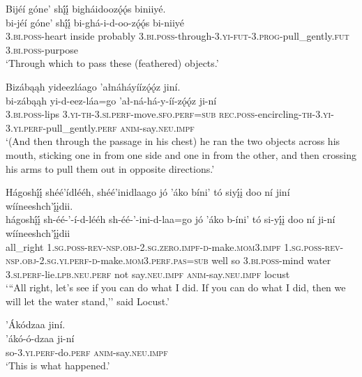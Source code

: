 \ea\label{ex:text4-4-23}
Bijéí góne’ shį́į́ bigháidoozǫ́ǫ́s biniiyé.\\
\gll bi-jéí	góne’	shį́į́	bi-ghá-i-d-oo-zǫ́ǫ́s	bi-niiyé\\
     3.\textsc{bi}.\textsc{poss}-heart	inside	probably	3.\textsc{bi}.\textsc{poss}-through-3.\textsc{yi}-\textsc{fut}-3.\textsc{prog}-pull\_gently.\textsc{fut}	3.\textsc{bi}.\textsc{poss}-purpose\\
\glt `Through which to pass these (feathered) objects.'
\z

\ea\label{ex:text4-4-24}
Bizábąąh yideezláago ’ałnáháyíízǫ́ǫ́z jiní.\\
\gll bi-zábąąh	yi-d-eez-láa=go	’ał-ná-há-y-íí-zǫ́ǫ́z	ji-ní\\
     3.\textsc{bi}.\textsc{poss}-lips	3.\textsc{yi}-\textsc{th}-3.\textsc{si}.\textsc{perf}-move.\textsc{sfo}.\textsc{perf}=\textsc{sub}	\textsc{rec}.\textsc{poss}-encircling-\textsc{th}-3.\textsc{yi}-3.\textsc{yi}.\textsc{perf}-pull\_gently.\textsc{perf}	\textsc{anim}-say.\textsc{neu}.\textsc{impf}\\
\glt `(And then through the passage in his chest) he ran the two objects across his mouth, sticking one in from one side and one in from the other, and then crossing his arms to pull them out in opposite directions.'
\z

\ea\label{ex:text4-4-25}
Hágoshį́į́ shéé’ídlééh, shéé’inidlaago jó ’áko bíni’ tó siyį́į doo ní jiní wííneeshch’į́įdii.\\
\gll hágoshį́į́	sh-éé-’-í-d-lééh	sh-éé-’-ini-d-laa=go	jó	’áko	b-íni’	tó	si-yį́į	doo	ní	ji-ní	wííneeshch’į́įdii\\
     all\_right	1.\textsc{sg}.\textsc{poss}-\textsc{rev}-\textsc{nsp}.\textsc{obj}-2.\textsc{sg}.\textsc{zero}.\textsc{impf}-\textsc{d}-make.\textsc{mom}3.\textsc{impf}	1.\textsc{sg}.\textsc{poss}-\textsc{rev}-\textsc{nsp}.\textsc{obj}-2.\textsc{sg}.\textsc{yi}.\textsc{perf}-\textsc{d}-make.\textsc{mom}3.\textsc{perf}.\textsc{pas}=\textsc{sub}	well	so	3.\textsc{bi}.\textsc{poss}-mind	water	3.\textsc{si}.\textsc{perf}-lie.\textsc{lpb}.\textsc{neu}.\textsc{perf}	not	say.\textsc{neu}.\textsc{impf}	\textsc{anim}-say.\textsc{neu}.\textsc{impf}	locust\\
\glt `{``}All right, let's see if you can do what I did. If you can do what I did, then we will let the water stand,'' said Locust.'
\z

\ea\label{ex:text4-4-26}
’Ákódzaa jiní.\\
\gll ’ákó-ó-dzaa	ji-ní\\
     so-3.\textsc{yi}.\textsc{perf}-do.\textsc{perf}	\textsc{anim}-say.\textsc{neu}.\textsc{impf}\\
\glt `This is what happened.'
\z

